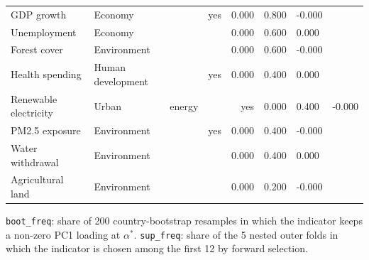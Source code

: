 \begin{table}[t]
\begin{tabular}{llccrr}
GDP growth & Economy &  & yes & 0.000 & 0.800 & -0.000 \\
Unemployment & Economy &  &  & 0.000 & 0.600 & 0.000 \\
Forest cover & Environment &  &  & 0.000 & 0.600 & -0.000 \\
Health spending & Human development &  & yes & 0.000 & 0.400 & 0.000 \\
Renewable electricity & Urban & energy &  & yes & 0.000 & 0.400 & -0.000 \\
PM2.5 exposure & Environment &  & yes & 0.000 & 0.400 & -0.000 \\
Water withdrawal & Environment &  &  & 0.000 & 0.400 & 0.000 \\
Agricultural land & Environment &  &  & 0.000 & 0.200 & -0.000 \\
\bottomrule
\end{tabular}
\vspace{2pt}\parbox{0.92\linewidth}{\footnotesize \texttt{boot\_freq}: share of 200 country-bootstrap resamples in which the indicator keeps a non-zero PC1 loading at $\alpha^*$. \texttt{sup\_freq}: share of the 5 nested outer folds in which the indicator is chosen among the first 12 by forward selection.}
\end{table}
